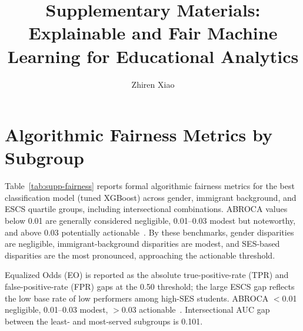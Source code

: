 \documentclass[journal]{IEEEtran}
\begin{document}
\title{Supplementary Materials: Explainable and Fair Machine Learning for Educational Analytics}

\author{Zhiren Xiao}

\maketitle

\section{Algorithmic Fairness Metrics by Subgroup}
\label{sec:s1}

Table~\ref{tab:supp-fairness} reports formal algorithmic fairness metrics for the best classification model (tuned XGBoost) across gender, immigrant background, and ESCS quartile groups, including intersectional combinations. ABROCA values below 0.01 are generally considered negligible, 0.01--0.03 modest but noteworthy, and above 0.03 potentially actionable~\cite{Gandara_2024_blackbox,Verger_2024_MADD}. By these benchmarks, gender disparities are negligible, immigrant-background disparities are modest, and SES-based disparities are the most pronounced, approaching the actionable threshold.

\begin{table}[!t]
\centering
\caption{Formal Algorithmic Fairness Metrics by Subgroup}
\label{tab:supp-fairness}
\footnotesize
{}
\vspace{2pt}
{\footnotesize Equalized Odds (EO) is reported as the absolute true-positive-rate (TPR) and false-positive-rate (FPR) gaps at the 0.50 threshold; the large ESCS gap reflects the low base rate of low performers among high-SES students. ABROCA $<$0.01 negligible, 0.01--0.03 modest, $>$0.03 actionable~\cite{Gandara_2024_blackbox,Verger_2024_MADD}. Intersectional AUC gap between the least- and most-served subgroups is 0.101.}
\end{table}
\end{document}
